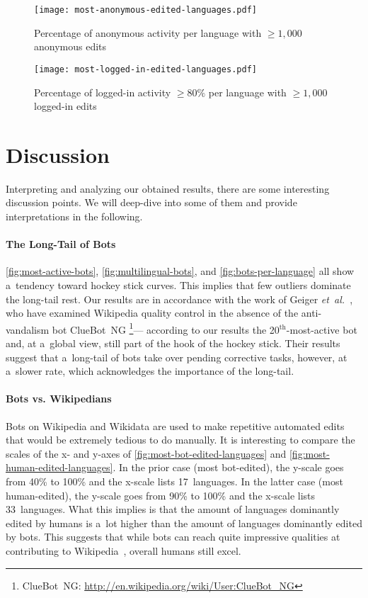 \documentclass{sig-alternate}
\newcommand{\superscript}[1]{\ensuremath{^{\textrm{#1}}}}
\newcommand{\inlinelistingsize}{\fontsize{8pt}{11pt}}
\let\oldurl\url
\renewcommand{\url}[1]{\inlinelistingsize\oldurl{#1}}
\begin{document}
\begin{figure}[p]
  \center
  \texttt{[image: most-anonymous-edited-languages.pdf]}
  \caption{Percentage of anonymous activity per language with $\geq1,000$ anonymous edits}
  \label{fig:most-anonymous-edited-languages}
\end{figure}

\begin{figure}[p]
  \center
  \texttt{[image: most-logged-in-edited-languages.pdf]}
  \caption{Percentage of logged-in activity $\geq80\%$ per language with $\geq1,000$ logged-in edits}
  \label{fig:most-logged-in-edited-languages}
\end{figure}

\section{Discussion}

Interpreting and analyzing our obtained results,
there are some interesting discussion points.
We will deep-dive into some of them and provide interpretations
in the following.

\paragraph{The Long-Tail of Bots}

\autoref{fig:most-active-bots}, \autoref{fig:multilingual-bots},
and \autoref{fig:bots-per-language} all show a~tendency toward
hockey stick curves.
This implies that few outliers dominate
the long-tail rest.
Our results are in accordance with the work of Geiger \emph{et~al.}\
\cite{geiger2013withoutbots}, who have examined Wiki\-pedia 
quality control in the absence of the anti-vandalism bot ClueBot~NG%
\footnote{ClueBot~NG: \url{http://en.wikipedia.org/wiki/User:ClueBot_NG}}---%
according to our results
the 20\superscript{th}-most-active bot
and, at a~global view, still part of the hook
of the hockey stick.
Their results suggest that a~long-tail of bots
take over pending corrective tasks, however, at a~slower rate,
which acknowledges the importance of the long-tail.

\paragraph{Bots vs. Wikipedians}
\label{sec:bots-vs-wikipedians}

Bots on Wikipedia and Wikidata are used to make
repetitive automated edits
that would be extremely tedious to do manually.
It is interesting to compare the scales of the x- and y-axes of
\autoref{fig:most-bot-edited-languages} and
\autoref{fig:most-human-edited-languages}.
In the prior case (most bot-edited),
the y-scale goes from 40\% to 100\%
and the x-scale lists 17~languages.
In the latter case (most human-edited),
the y-scale goes from 90\% to 100\%
and the x-scale lists 33~languages.
What this implies is that the amount of languages dominantly edited by humans is a~lot higher than the amount
of languages dominantly edited by bots.
This suggests that while bots can reach quite
impressive qualities at contributing to Wikipedia~\cite{guldbrandsson2013bots},
overall humans still excel.
\end{document}
